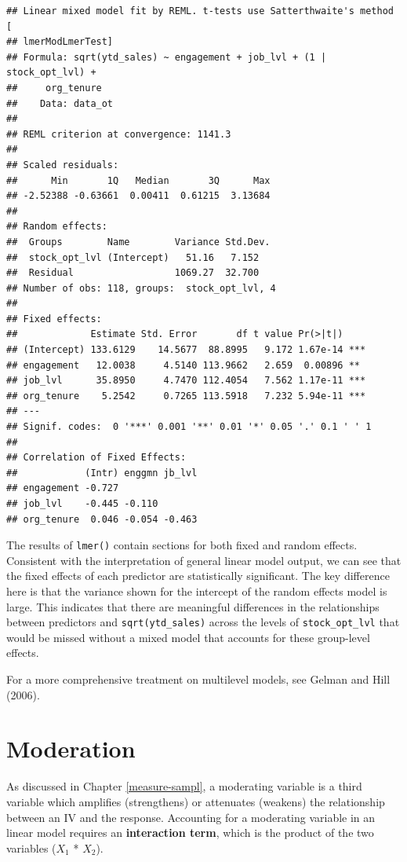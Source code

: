 \documentclass[
]{book}
\begin{document}
\begin{verbatim}
## Linear mixed model fit by REML. t-tests use Satterthwaite's method [
## lmerModLmerTest]
## Formula: sqrt(ytd_sales) ~ engagement + job_lvl + (1 | stock_opt_lvl) +  
##     org_tenure
##    Data: data_ot
## 
## REML criterion at convergence: 1141.3
## 
## Scaled residuals: 
##      Min       1Q   Median       3Q      Max 
## -2.52388 -0.63661  0.00411  0.61215  3.13684 
## 
## Random effects:
##  Groups        Name        Variance Std.Dev.
##  stock_opt_lvl (Intercept)   51.16   7.152  
##  Residual                  1069.27  32.700  
## Number of obs: 118, groups:  stock_opt_lvl, 4
## 
## Fixed effects:
##             Estimate Std. Error       df t value Pr(>|t|)    
## (Intercept) 133.6129    14.5677  88.8995   9.172 1.67e-14 ***
## engagement   12.0038     4.5140 113.9662   2.659  0.00896 ** 
## job_lvl      35.8950     4.7470 112.4054   7.562 1.17e-11 ***
## org_tenure    5.2542     0.7265 113.5918   7.232 5.94e-11 ***
## ---
## Signif. codes:  0 '***' 0.001 '**' 0.01 '*' 0.05 '.' 0.1 ' ' 1
## 
## Correlation of Fixed Effects:
##            (Intr) enggmn jb_lvl
## engagement -0.727              
## job_lvl    -0.445 -0.110       
## org_tenure  0.046 -0.054 -0.463
\end{verbatim}

The results of \texttt{lmer()} contain sections for both fixed and random effects. Consistent with the interpretation of general linear model output, we can see that the fixed effects of each predictor are statistically significant. The key difference here is that the variance shown for the intercept of the random effects model is large. This indicates that there are meaningful differences in the relationships between predictors and \texttt{sqrt(ytd\_sales)} across the levels of \texttt{stock\_opt\_lvl} that would be missed without a mixed model that accounts for these group-level effects.

For a more comprehensive treatment on multilevel models, see Gelman and Hill (2006).

\hypertarget{moderation}{%
\section{Moderation}\label{moderation}}

As discussed in Chapter \ref{measure-sampl}, a moderating variable is a third variable which amplifies (strengthens) or attenuates (weakens) the relationship between an IV and the response. Accounting for a moderating variable in an linear model requires an \textbf{interaction term}, which is the product of the two variables (\(X_1\) * \(X_2\)).
\end{document}
